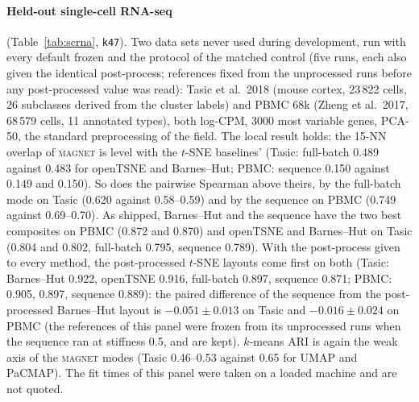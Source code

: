 \documentclass[11pt]{article}
\newcommand{\magnet}{\textsc{magnet}}
\begin{document}
\paragraph{Held-out single-cell RNA-seq} (Table~\ref{tab:scrna}, \texttt{k47}). Two data sets never used during
development, run with every default frozen and the protocol of the matched control (five runs, each also given the
identical post-process; references fixed from the unprocessed runs before any post-processed value was read):
Tasic et al.\ 2018 (mouse cortex, 23\,822 cells, 26 subclasses derived from the cluster labels) and PBMC 68k (Zheng
et al.\ 2017, 68\,579 cells, 11 annotated types), both log-CPM, 3000 most variable genes, PCA-50, the standard
preprocessing of the field. The local result holds: the 15-NN overlap of \magnet{} is level with the $t$-SNE
baselines' (Tasic: full-batch 0.489 against 0.483 for openTSNE and Barnes--Hut; PBMC: sequence 0.150 against 0.149
and 0.150). So does the pairwise Spearman above theirs, by the full-batch mode on Tasic (0.620 against 0.58--0.59)
and by the sequence on PBMC (0.749 against 0.69--0.70). As shipped, Barnes--Hut and the sequence have the two best
composites on PBMC (0.872 and 0.870) and openTSNE and Barnes--Hut on Tasic (0.804 and 0.802, full-batch 0.795, sequence 0.789).
With the post-process given to every method, the post-processed $t$-SNE layouts come first on both (Tasic:
Barnes--Hut 0.922, openTSNE 0.916, full-batch 0.897, sequence 0.871; PBMC: 0.905, 0.897, sequence 0.889): the
paired difference of the sequence from the post-processed Barnes--Hut layout is $-0.051 \pm 0.013$ on Tasic and
$-0.016 \pm 0.024$ on PBMC (the references of this panel were frozen from its unprocessed runs when the sequence ran
at stiffness 0.5, and are kept). $k$-means ARI is again the weak axis of the \magnet{} modes (Tasic 0.46--0.53 against
0.65 for UMAP and PaCMAP). The fit times of this panel were taken on a loaded machine and are not quoted.

\begin{table}[t]
\centering\footnotesize
\caption{Held-out single-cell RNA-seq (\texttt{k47}): raw axes as shipped and the geometric composite as shipped and
with the identical post-process, mean over five runs, every \magnet{} default frozen; references fixed from the
unprocessed runs (Tasic 0.489 / 0.941 / 0.649, PBMC 0.151 / 0.864 / 0.253). Best per column in bold, second
underlined, among the ranked configurations.}
\label{tab:scrna}
\setlength{\tabcolsep}{3pt}
\resizebox{\textwidth}{!}{}
\end{table}
\end{document}
